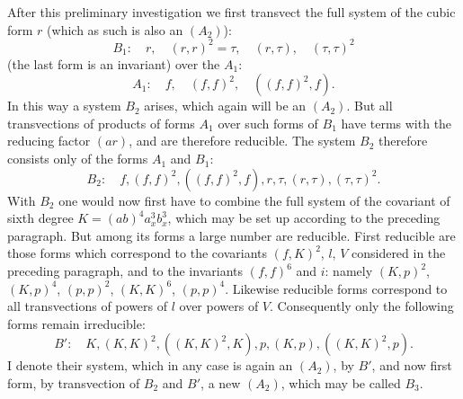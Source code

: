 \documentclass[10pt]{article}
\begin{document}
After this preliminary investigation we first transvect the full system of the cubic form $r$ (which as such is also an $(A_2)$):
\[
B_1:
\quad r,
\quad (r,r)^2=\tau,
\quad (r,\tau),
\quad (\tau,\tau)^2
\]
(the last form is an invariant) over the $A_1$:
\[
A_1:
\quad f,
\quad (f,f)^2,
\quad ((f,f)^2,f).
\]
In this way a system $B_2$ arises, which again will be an $(A_2)$. But all transvections of products of forms $A_1$ over such forms of $B_1$ have terms with the reducing factor $(ar)$, and are therefore reducible. The system $B_2$ therefore consists only of the forms $A_1$ and $B_1$:
\[
B_2:
\quad f,(f,f)^2,((f,f)^2,f),r,\tau,(r,\tau),(\tau,\tau)^2.
\]
With $B_2$ one would now first have to combine the full system of the covariant of sixth degree $K=(ab)^4a_x^3b_x^3$, which may be set up according to the preceding paragraph. But among its forms a large number are reducible. First reducible are those forms which correspond to the covariants $(f,K)^2$, $l$, $V$ considered in the preceding paragraph, and to the invariants $(f,f)^6$ and $i$: namely $(K,p)^2$, $(K,p)^4$, $(p,p)^2$, $(K,K)^6$, $(p,p)^4$. Likewise reducible forms correspond to all transvections of powers of $l$ over powers of $V$. Consequently only the following forms remain irreducible:
\[
B':
\quad K,(K,K)^2,((K,K)^2,K),p,(K,p),((K,K)^2,p).
\]
I denote their system, which in any case is again an $(A_2)$, by $B'$, and now first form, by transvection of $B_2$ and $B'$, a new $(A_2)$, which may be called $B_3$.
\end{document}
